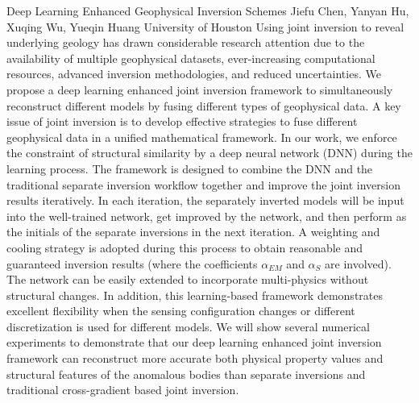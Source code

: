 \begin{addmargin}[2em]{0em}
\vspace{1.5ex}
\abs
{Deep Learning Enhanced Geophysical Inversion Schemes}
{Jiefu Chen, Yanyan Hu, Xuqing Wu, Yueqin Huang}
{University of Houston}
{Using joint inversion to reveal underlying geology has drawn considerable research attention due to the availability of multiple geophysical datasets, ever-increasing computational resources, advanced inversion methodologies, and reduced uncertainties. We propose a deep learning enhanced joint inversion framework to simultaneously reconstruct different models by fusing different types of geophysical data. A key issue of joint inversion is to develop effective strategies to fuse different geophysical data in a unified mathematical framework. In our work, we enforce the constraint of structural similarity by a deep neural network (DNN) during the learning process. The framework is designed to combine the DNN and the traditional separate inversion workflow together and improve the joint inversion results iteratively. In each iteration, the separately inverted models will be input into the well-trained network, get improved by the network, and then perform as the initials of the separate inversions in the next iteration. A weighting and cooling strategy is adopted during this process to obtain reasonable and guaranteed inversion results (where the coefficients $\alpha_{EM}$ and $\alpha_S$ are involved). The network can be easily extended to incorporate multi-physics without structural changes. In addition, this learning-based framework demonstrates excellent flexibility when the sensing configuration changes or different discretization is used for different models. We will show several numerical experiments to demonstrate that our deep learning enhanced joint inversion framework can reconstruct more accurate both physical property values and structural features of the anomalous bodies than separate inversions and traditional cross-gradient based joint inversion.}



\end{addmargin}
